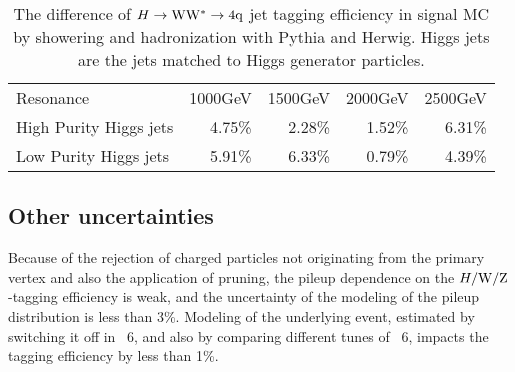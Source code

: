 \begin{table}[htbp]
\begin{center}
\caption{
The difference of $H\to{\rm W}{\rm W}^*\to4{\rm q}$ jet tagging efficiency in signal MC 
by showering and hadronization with Pythia and Herwig. Higgs jets
are the jets matched to Higgs generator particles. } 
\label{table:Difference}

\begin{tabular}{|l|r|r|r|r|}
\hline
Resonance & \multicolumn{1}{l|}{1000GeV} & \multicolumn{1}{l|}{1500GeV} & \multicolumn{1}{l|}{2000GeV} & \multicolumn{1}{l|}{2500GeV} \\ 
High Purity Higgs jets & 4.75\% & 2.28\% & 1.52\% & 6.31\% \\ 
Low Purity Higgs jets & 5.91\% & 6.33\% & 0.79\% & 4.39\% \\ \hline
\end{tabular}
\end{center}
\end{table}


\subsection{Other uncertainties}

Because of the rejection of charged particles not
originating from the primary vertex and also the application of
pruning, the pileup dependence on the $H/{\rm W}/{\rm Z}$-tagging efficiency
is weak, and the uncertainty of the modeling of the pileup
distribution is less than 3\%.  Modeling of the underlying event,
estimated by switching it off in \PYTHIA~6, and also by comparing 
different tunes of \PYTHIA~6, 
impacts the tagging
efficiency by less than 1\%. %

